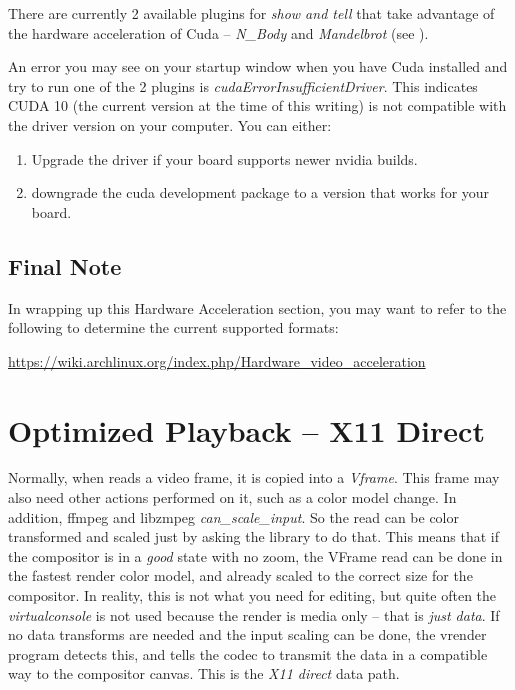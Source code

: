 There are currently 2 available plugins for \textit{show and tell} that take advantage of the hardware acceleration of Cuda -- \textit{N\_Body} and \textit{Mandelbrot} (see ).

An error you may see on your \CGG{} startup window when you have Cuda installed and try to run one of the 2 plugins is \textit{cudaErrorInsufficientDriver}.  This indicates CUDA 10 (the current version at the time of this writing) is not compatible with the driver version on your computer.  You can either:

\begin{enumerate}
	\item Upgrade the driver if your board supports newer nvidia builds.
	\item downgrade the cuda development package to a version that works for your board.
\end{enumerate}

\subsection{Final Note}%
\label{sub:final_note_on_acceleration}

In wrapping up this Hardware Acceleration section, you may want to refer to the following to determine the current supported formats:

{\small \url{https://wiki.archlinux.org/index.php/Hardware_video_acceleration}}

\section{Optimized Playback -- X11 Direct}%
\label{sec:optimized_playback}

Normally, when \CGG{} reads a video frame, it is copied into a \textit{Vframe}.  This frame may also need other actions performed on it, such as a color model change.  In addition, ffmpeg and libzmpeg \textit{can\_scale\_input}.  So the read can be color transformed and scaled just by asking the library to do that.  This means that if the compositor is in a \textit{good} state with no zoom, the VFrame read can be done in the fastest render color model, and already scaled to the correct size for the compositor.  In reality, this is not what you need for editing, but quite often the \textit{virtualconsole} is not used because the render is media only -- that is \textit{just data}.  If no data transforms are needed and the input scaling can be done, the vrender program detects this, and tells the codec to transmit the data in a compatible way to the compositor canvas. This is the \textit{X11 direct} data path.

